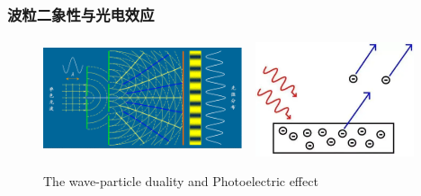 \frame
{
	\frametitle{波粒二象性与光电效应}
\begin{figure}[h!]
\centering
\vspace{-15.5pt}
\includegraphics[height=1.35in,width=2.30in,viewport=0 0 536 280,clip]{Figures/wave-particle_duality.png}
\vskip 1pt
\includegraphics[height=1.32in,width=2.05in,viewport=0 0 620 455,clip]{Figures/Photoelectic_effect.png}
\caption{\textrm{The wave-particle duality and Photoelectric effect}}
\label{wave_and_particle}
\end{figure}
}

